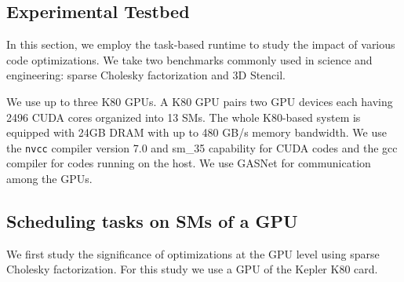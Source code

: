 \subsection{Experimental Testbed}
In this section, we employ the task-based runtime to study the impact of various code optimizations.
We take two benchmarks commonly used in science and engineering: sparse Cholesky factorization and 3D Stencil.

We use up to three K80 GPUs.
A K80 GPU pairs two GPU devices each having 2496 CUDA cores organized into 13 SMs.
The whole K80-based system is equipped with 24GB DRAM with up to 480 GB/s memory bandwidth.
We use the {\tt nvcc} compiler version 7.0 and sm\_35 capability for CUDA codes and the gcc compiler for codes running on the host.
We use GASNet for communication among the GPUs. 


\subsection{Scheduling tasks on SMs of a GPU}
We first study the significance of optimizations at the GPU level using sparse Cholesky factorization.
For this study we use a GPU of the Kepler K80 card.

